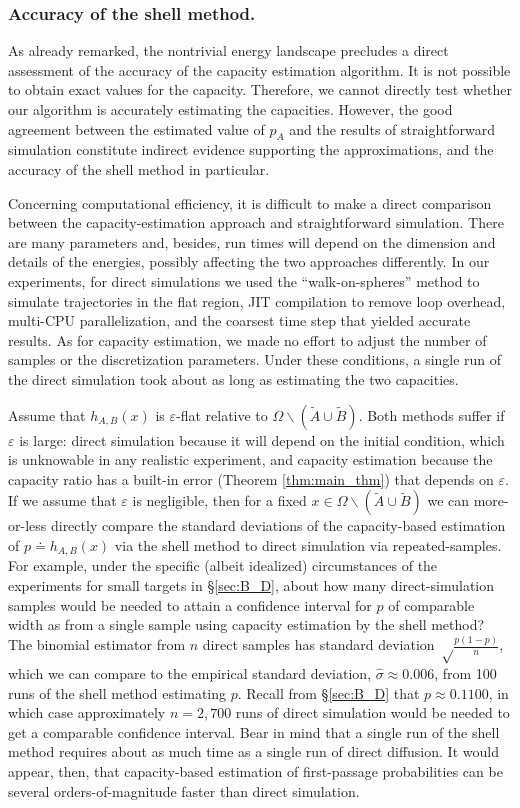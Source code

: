 \documentclass[12pt, nofootinbib,english, amsmath, amssymb, aps, priprint, graphicx,floatfix]{revtex4-1}
\theoremstyle{plain}
\theoremstyle{definition}
\theoremstyle{plain}
\begin{document}
\subsubsection{Accuracy of the shell method.}

As already remarked, the nontrivial energy landscape precludes a direct assessment of the accuracy of the capacity estimation algorithm.  It is not possible to obtain exact values for the capacity.  Therefore, we cannot directly test whether our algorithm is accurately estimating the capacities.  However, the good agreement between the estimated value of $p_A$ and the results of straightforward simulation constitute indirect evidence supporting the approximations, and the accuracy of the shell method in particular.

Concerning computational efficiency, it is difficult to make a direct comparison between the capacity-estimation approach and straightforward simulation. There are many parameters and, besides, run times will depend on the dimension and details of the energies, possibly affecting the two approaches differently. In our experiments, for direct simulations we used the ``walk-on-spheres'' method to simulate trajectories in the flat region,\cite{bingham1972random} JIT compilation to remove loop overhead, multi-CPU parallelization, and the coarsest time step that yielded accurate results. As for capacity estimation, we made no effort to adjust the number of samples or the discretization parameters. Under these conditions, a single run of the direct simulation took about as long as estimating the two capacities.

Assume that  $h_{A,B}(x)$ is $\varepsilon$-flat relative to $\Omega \backslash (\tilde A \cup \tilde B)$. Both methods suffer if $\varepsilon$ is large: direct simulation because it will depend on the initial condition, which is unknowable in any realistic experiment, and capacity estimation because the capacity ratio has a built-in error (Theorem \ref{thm:main_thm}) that depends on $\varepsilon$. If we assume that $\varepsilon$ is negligible, then for a fixed $x\in\Omega \backslash (\tilde A \cup \tilde B)$ we can more-or-less directly compare the standard deviations of the capacity-based estimation of $p\doteq h_{A,B}(x)$ via the shell method to direct simulation via repeated-samples. For example, under the specific (albeit idealized) circumstances of the experiments for small targets in \S\ref{sec:B_D}, about how many direct-simulation samples would be needed to attain a confidence interval for $p$ of comparable width as from a single sample using capacity estimation by the shell method? The binomial estimator from $n$ direct samples has standard deviation $\sqrt\frac{p(1-p)}{n}$, which we can compare to the empirical standard deviation, $\hat{\sigma}\approx 0.006$, from 100 runs of the shell method estimating $p$. Recall from \S\ref{sec:B_D} that $p\approx 0.1100$, in which case approximately $n=2,700$ runs of direct simulation would be needed to get a comparable confidence interval. Bear in mind that a single run of the shell method requires about as much time as  a single run of direct diffusion. It would appear, then, that capacity-based estimation of first-passage probabilities can be several orders-of-magnitude faster than direct simulation.
\end{document}

